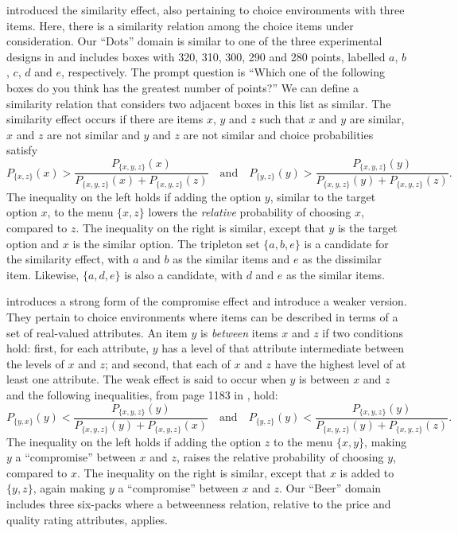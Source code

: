 \documentclass[11pt,letter]{article}
\newcommand{\menu}{menu}
\newcommand{\bin}[2]{P_{\{#1,#2\}}(#1)}
\begin{document}
\citet{Tver72a} introduced the similarity effect, also pertaining to choice environments with three items.
Here, there is a similarity relation among the choice items under consideration.
Our ``Dots'' domain is similar to one of the three experimental designs in \citet{Tver72a} and includes boxes with 320, 310, 300, 290 and 280 points, labelled $a$, $b$, $c$, $d$ and $e$, respectively.
The prompt question is ``Which one of the following boxes do you think has the greatest number of points?''
We can define a similarity relation that considers two adjacent boxes in this list as similar.
The similarity effect occurs if there are items $x$, $y$ and $z$ such that $x$ and $y$ are similar, $x$ and $z$ are not similar and $y$ and $z$ are not similar and choice probabilities satisfy
\[
  \bin{x}{z} > \frac{P_{\{x,y,z\}}(x)}{P_{\{x,y,z\}}(x) + P_{\{x,y,z\}}(z)}
  \quad \mbox{and} \quad
  \bin{y}{z} > \frac{P_{\{x,y,z\}}(y)}{P_{\{x,y,z\}}(y) + P_{\{x,y,z\}}(z)}.
\]
The inequality on the left holds if adding the option $y$, similar to the target option $x$, to the \menu{} $\{x,z\}$ lowers the {\em relative} probability of choosing $x$, compared to $z$.
The inequality on the right is similar, except that $y$ is the target option and $x$ is the similar option.
The tripleton set $\{a, b, e\}$ is a candidate for the similarity effect, with $a$ and $b$ as the similar items and $e$ as the dissimilar item.
Likewise, $\{a, d, e\}$ is also a candidate, with $d$ and $e$ as the similar items.

\citet{Simo89} introduces a strong form of the compromise effect and \citet{TverSimo93} introduce a weaker version.
They pertain to choice environments where items can be described in terms of a set of real-valued attributes.
An item $y$ is {\em between} items $x$ and $z$ if two conditions hold: first, for each attribute, $y$ has a level of that attribute intermediate between the levels of $x$ and $z$; and second, that each of $x$ and $z$ have the highest level of at least one attribute.
The weak effect is said to occur when $y$ is between $x$ and $z$ and the following inequalities, from page 1183 in \citet{TverSimo93}, hold:
\[
  \bin{y}{x} < \frac{P_{\{x,y,z\}}(y)}{P_{\{x,y,z\}}(y) + P_{\{x,y,z\}}(x)}
  \quad \mbox{and} \quad
  \bin{y}{z} < \frac{P_{\{x,y,z\}}(y)}{P_{\{x,y,z\}}(y) + P_{\{x,y,z\}}(z)}.
\]
The inequality on the left holds if adding the option $z$ to the \menu{} $\{x,y\}$, making $y$ a ``compromise'' between $x$ and $z$, raises the relative probability of choosing $y$, compared to $x$.
The inequality on the right is similar, except that $x$ is added to $\{y,z\}$, again making $y$ a ``compromise'' between $x$ and $z$.
Our ``Beer'' domain includes three six-packs where a betweenness relation, relative to the price and quality rating attributes, applies.
\end{document}
